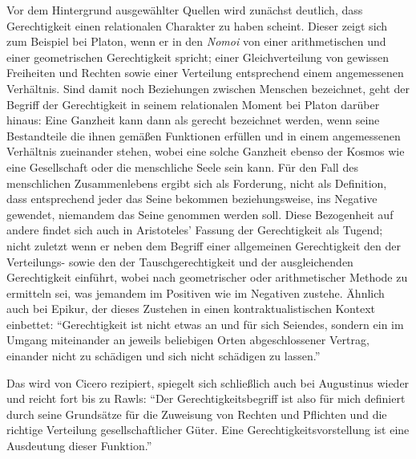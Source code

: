 \documentclass[a4paper]{thesis}
\begin{document}
Vor dem Hintergrund ausgewählter Quellen wird zunächst deutlich, dass Gerechtigkeit einen relationalen Charakter zu haben scheint. Dieser zeigt sich zum Beispiel bei Platon, wenn er in den \textit{Nomoi} von einer arithmetischen und einer geometrischen Gerechtigkeit spricht; einer Gleichverteilung von gewissen Freiheiten und Rechten sowie einer Verteilung entsprechend einem angemessenen Verhältnis. Sind damit noch Beziehungen zwischen Menschen bezeichnet, geht der Begriff der Gerechtigkeit in seinem relationalen Moment bei Platon darüber hinaus: Eine Ganzheit kann dann als gerecht bezeichnet werden, wenn seine Bestandteile die ihnen gemäßen Funktionen erfüllen und in einem angemessenen Verhältnis zueinander stehen, wobei eine solche Ganzheit ebenso der Kosmos wie eine Gesellschaft oder die menschliche Seele sein kann. Für den Fall des menschlichen Zusammenlebens ergibt sich als Forderung, nicht als Definition, dass entsprechend jeder das Seine bekommen beziehungsweise, ins Negative gewendet, niemandem das Seine genommen werden soll. Diese Bezogenheit auf andere findet sich auch in Aristoteles' Fassung der Gerechtigkeit als Tugend; nicht zuletzt wenn er neben dem Begriff einer allgemeinen Gerechtigkeit den der Verteilungs- sowie den der Tauschgerechtigkeit und der ausgleichenden Gerechtigkeit einführt, wobei nach geometrischer oder arithmetischer Methode zu ermitteln sei, was jemandem im Positiven wie im Negativen zustehe. Ähnlich auch bei Epikur, der dieses Zustehen in einen kontraktualistischen Kontext einbettet: \enquote{Gerechtigkeit ist nicht etwas an und für sich Seiendes, sondern ein im Umgang miteinander an jeweils beliebigen Orten abgeschlossener Vertrag, einander nicht zu schädigen und sich nicht schädigen zu lassen.}

Das wird von Cicero rezipiert, spiegelt sich schließlich auch bei Augustinus wieder und reicht fort bis zu Rawls: \enquote{Der Gerechtigkeitsbegriff ist also für mich definiert durch seine Grundsätze für die Zuweisung von Rechten und Pflichten und die richtige Verteilung gesellschaftlicher Güter. Eine Gerechtigkeitsvorstellung ist eine Ausdeutung dieser Funktion.}
\end{document}
